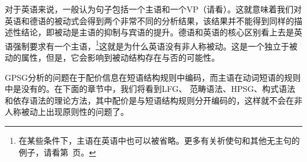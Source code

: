 对于英语来说，一般认为句子包括一个主语和一个VP（请看\citealp[]{GKPS85a}）。这就意味着我们对英语和德语的被动式会得到两个非常不同的分析结果，该结果并不能得到同样的描述性结论，即被动是主语的抑制与宾语的提升。德语和英语的核心区别看上去是英语强制要求有一个主语，\footnote{%
  在某些条件下，主语在英语中也可以被省略。更多有关祈使句和其他无主句的例子，请看第~\pageref{Beispiel-Imperativ-Englisch}页。
}这就是为什么英语没有非人称被动。这是一个独立于被动的属性，但是，它会影响到被动结构存在与否的可能性。

GPSG分析的问题在于配价信息在短语结构规则中编码，而主语在动词短语的规则中是没有的。在下面的章节中，我们将看到LFG\indexlfgc、
范畴语法\indexcgc、HPSG\indexhpsgc、构式语法\indexcxgc 和依存语法\indexdgc 的理论方法，其中配价是与短语结构规则分开编码的，这样就不会在非人称被动上出现原则性的问题了。

